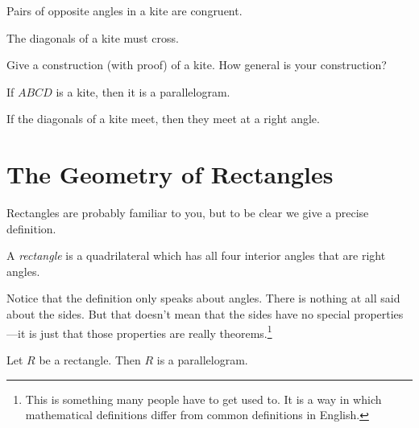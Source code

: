 \begin{conjecture}\label{conj:kite-opp-angles}
Pairs of opposite angles in a kite are congruent.
\end{conjecture}

\begin{conjecture}\label{conj:kite-diagonals-cross}
The diagonals of a kite must cross.
\end{conjecture}

\begin{problem}\label{prob:construct-kites}
Give a construction (with proof) of a kite.
How general is your construction?
\end{problem}

\begin{conjecture}\label{conj:kite-is-parallelogram}
If $ABCD$ is a kite, then it is a parallelogram.
\end{conjecture}

\begin{conjecture}\label{conj:kite-diagonals-perpendicular}
If the diagonals of a kite meet, then they meet at a right angle.
\end{conjecture}



\chapter{The Geometry of Rectangles}\label{section:rectangles}

Rectangles are probably familiar to you, but to be clear we give a precise definition.
\begin{definition}\label{defn:rectangle}
A \emph{rectangle} is a quadrilateral which has all four interior angles that are right angles.
\end{definition}

Notice that the definition only speaks about angles. There is nothing at all said about the sides.
But that doesn't mean that the sides have no special properties---it is just that those properties are really theorems.\footnote{This is something many people have to get used to. It is a way in which mathematical definitions differ from common definitions in English.}

\begin{conjecture}\label{conj:rectangle-parallelogram}
Let $R$ be a rectangle. Then $R$ is a parallelogram.
\end{conjecture}

